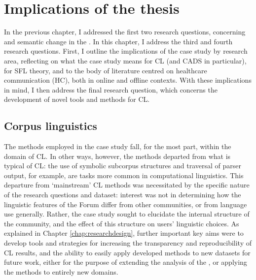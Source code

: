 
\chapter{Implications of the thesis} \label{chap:implications}


In the previous chapter, I addressed the first two research questions, concerning  and semantic change in the . In this chapter, I address the third and fourth research questions. First, I outline the implications of the case study by research area, reflecting on what the case study means for \gls{CL} (and \gls{CADS} in particular), for \gls{SFL} theory, and to the body of literature centred on healthcare communication (HC), both in online and offline contexts. With these implications in mind, I then address the final research question, which concerns the development of novel tools and methods for \gls{CL}.

\section{Corpus linguistics}

The methods employed in the case study fall, for the most part, within the domain of \gls{CL}. In other ways, however, the methods departed from what is typical of \gls{CL}: the use of symbolic subcorpus structures and traversal of parser output, for example, are tasks more common in computational linguistics. This departure from `mainstream' \gls{CL} methods was necessitated by the specific nature of the research questions and dataset: interest was not in determining how the linguistic features of the \gls{Forum} differ from other communities, or from language use generally. Rather, the case study sought to elucidate the internal structure of the community, and the effect of this structure on users' linguistic choices. As explained in Chapter \ref{chap:researchdesign}, further important key aims were to develop tools and strategies for increasing the transparency and reproducibility of \gls{CL} results, and the ability to easily apply developed methods to new datasets for future work, either for the purpose of extending the analysis of the , or applying the methods to entirely new domains.

